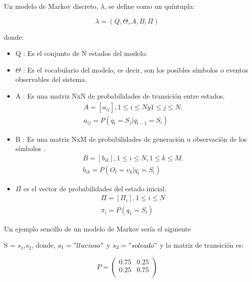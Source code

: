 Un modelo de Markov discreto, $\lambda$, se define como un quíntupla:

\begin{equation}
\lambda = (Q,\Theta,A,B,\Pi)
\end{equation}

donde:
 
\begin{itemize}
\item Q :  Es el conjunto de N estados del modelo.
\item $\Theta$ : Es el vocabulario del modelo, es decir, son los posibles s\'imbolos o eventos observables del sistema.
\item A : Es una matriz NxN de probabilidades de transici\'on entre estados.
\begin{equation}
\begin{aligned}
A = [a_{ij}], 1\leq i \leq N  y  1\leq j \leq N.\\
a_{ij} = P(q_{t} = S_{j} | q_{t-1} = S_{i})
\end{aligned}
\end{equation}

\item B : Es una matriz NxM de probabilidades de generaci\'on u observación de los s\'imbolos .
\begin{equation}
\begin{aligned}
B = [b_{ik}], 1\leq i \leq N, 1\leq k \leq M.\\
b_{ik} = P(O_{t} = v_{k} | q_{t} = S_{i})
\end{aligned}
\end{equation}

\item $\Pi$ es el vector de probabilidades del estado inicial.
\begin{equation}
\begin{aligned}
\Pi = [\Pi_{i}], 1\leq i \leq N \\
\pi_{i} = P(q_{1} = S_{i})
\end{aligned}
\end{equation}

\end{itemize}

Un ejemplo sencillo de un modelo de Markov sería el siguiente \cite{ejemploMarkov}

S = {$s_{1}$,$s_{2}$}, donde, $s_{1} = "lluvioso"$ y $s_{2} = "soleado"$ y la matriz de transición es:

\[
 P = \begin{pmatrix}
  0.75 & 0.25  \\
  0.25 & 0.75  \\
 \end{pmatrix}
\]

